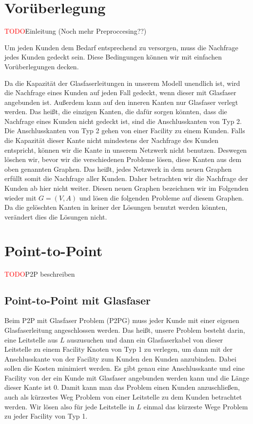 \documentclass[11pt,a4paper]{article}
\newcommand{\TODO}{\textcolor{red}{TODO}}
\theoremstyle{my_th_style1}
\begin{document}
\section{Vorüberlegung}
\label{preprocess}
\TODO Einleitung (Noch mehr Preproccesing??)

Um jeden Kunden dem Bedarf entsprechend zu versorgen, muss die Nachfrage jedes Kunden gedeckt sein.
Diese Bedingungen k\"onnen wir mit einfachen Vor\"uberlegungen decken.

Da die Kapazität der Glasfaserleitungen in unserem Modell unendlich ist, wird die Nachfrage eines Kunden auf jeden Fall gedeckt, wenn dieser mit Glasfaser angebunden ist.
Außerdem kann auf den inneren Kanten nur Glasfaser verlegt werden. Das heißt, die einzigen Kanten, die dafür sorgen könnten, dass die Nachfrage eines Kunden nicht gedeckt ist, sind die Anschlusskanten von Typ 2.
Die Anschlusskanten von Typ 2 gehen von einer Facility zu einem Kunden.
Falls die Kapazit\"at dieser Kante nicht mindestens der Nachfrage des Kunden entspricht, können wir die Kante in unserem Netzwerk nicht benutzen. 
Deswegen löschen wir, bevor wir die verschiedenen Probleme lösen, diese Kanten aus dem oben genannten Graphen.
Das heißt, jedes Netzwerk in dem neuen Graphen erfüllt somit die Nachfrage aller Kunden.
Daher betrachten wir die Nachfrage der Kunden ab hier nicht weiter.
Diesen neuen Graphen bezeichnen wir im Folgenden wieder mit $G=(V,A)$ und lösen die folgenden Probleme auf diesem Graphen.
Da die gelöschten Kanten in keiner der Lösungen benutzt werden könnten, verändert dies die Lösungen nicht.

\section{Point-to-Point}

\TODO P2P beschreiben

\subsection{Point-to-Point mit Glasfaser}

Beim P2P mit Glasfaser Problem (P2PG) muss jeder Kunde mit einer eigenen Glasfaserleitung angeschlossen werden. Das heißt, unsere Problem besteht darin, eine Leitstelle aus $L$ auszusuchen und dann ein Glasfaserkabel von dieser Leitstelle zu einem Facility Knoten von Typ 1 zu verlegen, um dann mit der Anschlusskante von der Facility zum Kunden den Kunden anzubinden. Dabei sollen die Kosten minimiert werden. Es gibt genau eine Anschlusskante und eine Facility von der ein Kunde mit Glasfaser angebunden werden kann und die Länge dieser Kante ist 0. Damit kann man das Problem einen Kunden anzuschließen, auch als kürzestes Weg Problem von einer Leitstelle zu dem Kunden betrachtet werden. Wir lösen also für jede Leitstelle in $L$ einmal das kürzeste Wege Problem zu jeder Facility von Typ 1.
\end{document}
